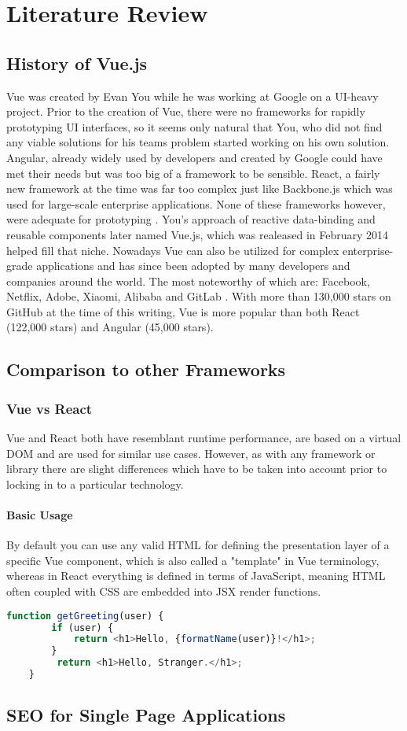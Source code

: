 \chapter[Literature Review]{Literature Review}

\section{History of Vue.js}
Vue was created by Evan You while he was working at Google on a UI-heavy project. Prior to the creation of Vue, there were no frameworks for rapidly prototyping UI interfaces, so it seems only natural that You, who did not find any viable solutions for his teams problem started working on his own solution. Angular, already widely used by developers and created by Google could have met their needs but was too big of a framework to be sensible. React, a fairly new framework at the time was far too complex just like Backbone.js which was used for large-scale enterprise applications. None of these frameworks however, were adequate for prototyping \cite[p.~10]{filipova2016learning}. You's approach of reactive data-binding and reusable components later named Vue.js, which was realeased in February 2014 \cite{wiki:Vue} helped fill that niche. Nowadays Vue can also be utilized for complex enterprise-grade applications and has since been adopted by many developers and companies around the world. The most noteworthy of which are: Facebook, Netflix, Adobe, Xiaomi, Alibaba and GitLab \cite{CompaniesUsingVue:online}. With more than 130,000 stars on GitHub at the time of this writing, Vue is more popular than both React (122,000 stars) and Angular (45,000 stars).


\section{Comparison to other Frameworks}

\subsection{Vue vs React}
Vue and React both have resemblant runtime performance, are based on a virtual DOM and are used for similar use cases. However, as with any framework or library there are slight differences which have to be taken into account prior to locking in to a particular technology.

\subsubsection{Basic Usage}
By default you can use any valid HTML for defining the presentation layer of a specific Vue component, which is also called a "template" in Vue terminology, whereas in React everything is defined in terms of JavaScript, meaning HTML often coupled with CSS are embedded into JSX render functions.


\begin{lstlisting}[language=javascript]
    function getGreeting(user) {
        if (user) {
            return <h1>Hello, {formatName(user)}!</h1>;
        }
         return <h1>Hello, Stranger.</h1>;
    }
\end{lstlisting}


\section{SEO for Single Page Applications}
